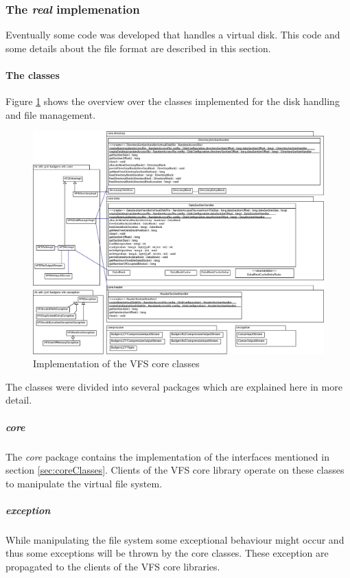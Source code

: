 \subsubsection{The \emph{real} implemenation}

Eventually some code was developed  that handles a virtual disk. This code and
some details about the file format are described in this section.

\paragraph{The classes}

Figure \ref{fig:vfs_impl_classes} shows the overview over the classes
implemented for the disk handling and file management.


\begin{figure}[h!]
\centering
\includegraphics[width=1\textwidth]{figures/vfs_impl_classes.eps}
\caption{Implementation of the VFS core classes}
\label{fig:vfs_impl_classes}
\end{figure}

The classes were divided into several packages which are explained here in more
detail.

\subparagraph{core}
The \textit{core} package contains the implementation of the interfaces
mentioned in section \ref{sec:coreClasses}. Clients of the VFS core library operate on these
classes to manipulate the virtual file system.


\subparagraph{exception}
While manipulating the file system some exceptional behaviour might occur and
thus some exceptions will be thrown by the core classes. These exception are
propagated to the clients of the VFS core libraries.

